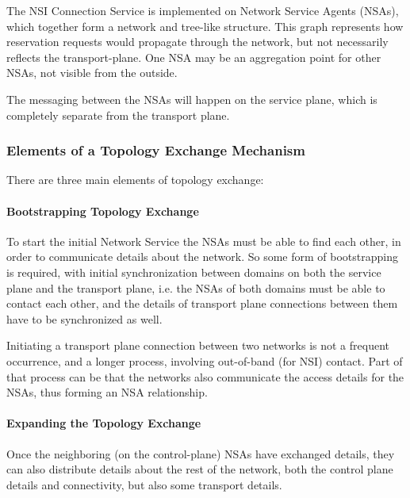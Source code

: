 \documentclass{article}
\begin{document}
 The NSI Connection Service is implemented on Network Service Agents 
(NSAs), which together form a network and tree-like structure. This graph represents 
how reservation requests would propagate through the network, but not necessarily 
reflects the transport-plane. One NSA may be an aggregation point for other NSAs, 
not visible from the outside.\label{h.mtia1ajwgzmv}


The messaging between the NSAs will happen on the 
service plane, which is completely separate from the transport plane.\label{h.dc66uw3zo12t}\label{h.ywjdj9kuwkou}


\subsubsection{Elements of a Topology Exchange Mechanism}

 There are three main elements of topology exchange: \label{h.u0b214m8krs}


\paragraph{Bootstrapping Topology Exchange}

 To start the initial Network Service the NSAs must be able to 
find each other, in order to communicate details about the network. So some form 
of bootstrapping is required, with initial synchronization between domains on both 
the service plane and the transport plane, i.e. the NSAs of both domains must be 
able to contact each other, and the details of transport plane connections between 
them have to be synchronized as well.\label{h.fzohc79rts8y}


Initiating a transport plane connection between two 
networks is not a frequent occurrence, and a longer process, involving out-of-band 
(for NSI) contact. Part of that process can be that the networks also communicate 
the access details for the NSAs, thus forming an NSA relationship.\label{h.30v92h80y7jj}


\paragraph{Expanding the Topology Exchange}

 Once the neighboring (on the control-plane) NSAs have exchanged 
details, they can also distribute details about the rest of the network, both the 
control plane details and connectivity, but also some transport details.\label{h.c1dz1g10oju}
\end{document}

